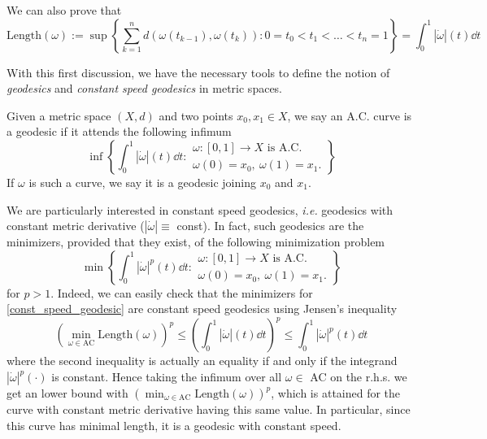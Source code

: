 We can also prove that 
\begin{equation}
\label{length}
\text{Length}(\omega) 
:= \sup
\left\{
\sum_{k = 1}^n d(\omega(t_{k -1}), \omega(t_{k})): 
0 = t_0 < t_1 < \dots < t_n = 1
\right\}
= \int_0^1|\dot{\omega}|(t)\dd t \end{equation}

With this first discussion, we have the necessary tools to define the notion of {\em geodesics} and {\em constant speed geodesics} in metric spaces. 

\begin{definition}
	\label{definition.geodesic}
	Given a metric space $(X,d)$ and two points $x_0, x_1 \in X$, we say an A.C. curve is a geodesic if it attends the following infimum 
	\begin{equation}
	\inf 
	\left\{
	\int_0^1 |\dot{\omega}|(t)\dd t: 
	\begin{array}{c}
	\omega :[0,1] \to X \text{ is A.C.}\\
	\omega(0) = x_0, \ \omega(1) = x_1.
	\end{array}
	\right\}
	\end{equation}
	If $\omega$ is such a curve, we say it is a geodesic joining $x_0$ and $x_1$. 
\end{definition}

We are particularly interested in constant speed geodesics, {\em i.e.} geodesics with constant metric derivative ($|\dot{\omega}| \equiv$ const). In fact, such geodesics are the minimizers, provided that they exist, of the following minimization problem
\begin{equation}
\label{const_speed_geodesic}
\min \left\{
\int_0^1 |\dot{\omega}|^p(t)\dd t: 
\begin{array}{c}
\omega :[0,1] \to X \text{ is A.C.}\\
\omega(0) = x_0, \ \omega(1) = x_1.
\end{array}
\right\}
\end{equation}
for $p>1$. Indeed, we can easily check that the minimizers for \eqref{const_speed_geodesic} are constant speed geodesics using Jensen's inequality
\begin{equation*}
\left(\min_{\omega \in \text{AC}}\text{Length}(\omega)\right)^p
\le 
\left(\int_0^1|\dot{\omega}|(t)\dd t\right)^p
\le 
\int_0^1 |\dot{\omega}|^p(t)\dd t
\end{equation*}
where the second inequality is actually an equality if and only if the integrand $|\dot{\omega}|^p(\cdot)$ is constant. Hence taking the infimum over all $\omega \in$ AC on the r.h.s. we get an lower bound with $\left(\min_{\omega \in \text{AC}}\text{Length}(\omega)\right)^p$, which is attained for the curve with constant metric derivative having this same value. In particular, since this curve has minimal length, it is a geodesic with constant speed. 

